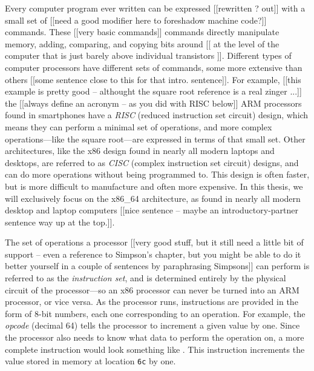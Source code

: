 \documentclass[thesis.tex]{subfiles}
\begin{document}
Every computer program ever written can be expressed [[rewritten ? out]] with a small set of [[need a good modifier here to foreshadow machine code?]] commands. These [[very basic commands]] commands directly manipulate memory, adding, comparing, and copying bits around [[ at the level of the computer that is just barely above individual transistors  ]]. Different types of computer processors have different sets of commands, some more extensive than others [[some sentence close to this for that intro. sentence]]. For example, [[this example is pretty good -- althought the square root reference is a real zinger ...]] the [[always define an acronym -- as you did with RISC below]] ARM processors found in smartphones have a \emph{RISC} (reduced instruction set circuit) design, which means they can perform a minimal set of operations, and more complex operations---like the square root---are expressed in terms of that small set. Other architectures, like the x86 design found in nearly all modern laptops and desktops, are referred to as \emph{CISC} (complex instruction set circuit) designs, and can do more operations without being programmed to. This design is often faster, but is more difficult to manufacture and often more expensive. In this thesis, we will exclusively focus on the x86\_64 architecture, as found in nearly all modern desktop and laptop computers [[nice sentence -- maybe an introductory-partner sentence way up at the top.]].

The set of operations a processor [[very good stuff, but it still need a little bit of support -- even a reference to Simpson's chapter, but you might be able to do it better yourself in a couple of sentences by  paraphrasing Simpsons]] can perform is referred to as the \emph{instruction set}, and is determined entirely by the physical circuit of the processor---so an x86 processor can never be turned into an ARM processor, or vice versa. As the processor runs, instructions are provided in the form of 8-bit numbers, each one corresponding to an operation. For example, the \emph{opcode}  (decimal 64) tells the processor to increment a given value by one. Since the processor also needs to know what data to perform the operation on, a more complete instruction would look something like . This instruction increments the value stored in memory at location \texttt{6c} by one.
\end{document}
